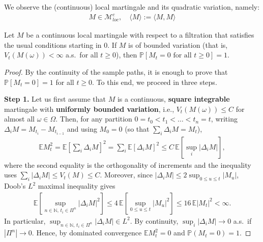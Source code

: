 We observe the (continuous) local martingale and its quadratic variation, namely:
\begin{align*}
	M \in \mathcal{M}^c_{loc}, \quad \langle M \rangle := \langle M , M \rangle
\end{align*}

\begin{lemma}
	Let $M$ be a continuous local martingale with respect to a filtration that satisfies the usual conditions starting in $0$. If $M$ is of bounded variation (that is, $V_t(M(\omega)) < \infty$ a.s.\ for all $t \ge 0$), then $\mathbb{P}[M_t = 0 \text{ for all } t \ge 0] = 1$.
\end{lemma}

\begin{proof}
	By the continuity of the sample paths, it is enough to prove that $\mathbb{P}[M_t = 0] = 1$ for all $t \ge 0$. To this end, we proceed in three steps.

	\textbf{Step 1.} Let us first assume that $M$ is a continuous, \textbf{square integrable} martingale with \textbf{uniformly bounded variation}, i.e., $V_t(M(\omega)) \le C$ for almost all $\omega \in \Omega$. Then, for any partition $0 = t_0 < t_1 < \dots < t_n = t$, writing $\Delta_i M = M_{t_i} - M_{t_{i-1}}$ and using $M_0 = 0$ (so that $\sum_i \Delta_i M = M_t$),
	\begin{align*}
		\mathbb{E} M_t^2 = \mathbb{E} \left[ \sum_i \Delta_i M \right]^2 = \sum_i \mathbb{E}[\Delta_i M]^2 \le C\, \mathbb{E}\left[ \sup_i |\Delta_i M| \right],
	\end{align*}
	where the second equality is the orthogonality of increments and the inequality uses $\sum_i |\Delta_i M| \le V_t(M) \le C$. Moreover, since $|\Delta_i M| \le 2 \sup_{0 \le u \le t} |M_u|$, Doob's $L^2$ maximal inequality gives
	\begin{align*}
		\mathbb{E}\left[ \sup_{n \in \mathbb{N},\, t_i \in \Pi^n} |\Delta_i M|^2 \right] \le 4\, \mathbb{E}\left[ \sup_{0 \le u \le t} |M_u|^2 \right] \le 16\, \mathbb{E}|M_t|^2 < \infty.
	\end{align*}
	In particular, $\sup_{n \in \mathbb{N},\, t_i \in \Pi^n} |\Delta_i M| \in L^2$. 
	By continuity, $\sup_i |\Delta_i M| \to 0$ a.s.\ if $|\Pi^n| \to 0$.
	Hence, by dominated convergence $\mathbb{E} M_t^2 = 0$ and $\mathbb{P}(M_t = 0) = 1$.


\end{proof}
